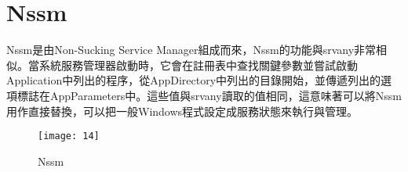 \renewcommand{\baselinestretch}{20} %
\section{Nssm}
\par
\renewcommand{\baselinestretch}{1} %
\twelve \qquad Nssm是由Non-Sucking Service Manager組成而來，Nssm的功能與srvany非常相似。當系統服務管理器啟動時，它會在註冊表中查找關鍵參數並嘗試啟動Application中列出的程序，從AppDirectory中列出的目錄開始，並傳遞列出的選項標誌在AppParameters中。這些值與srvany讀取的值相同，這意味著可以將Nssm用作直接替換，可以把一般Windows程式設定成服務狀態來執行與管理。
\\
\par
\renewcommand{\baselinestretch}{1.7} %
\begin{figure}[hbt!]
\begin{center}
\texttt{[image: 14]}
\caption{\large Nssm}\label{fig.Nssm}
\end{center}
\end{figure}
\par

\renewcommand{\baselinestretch}{20} %
